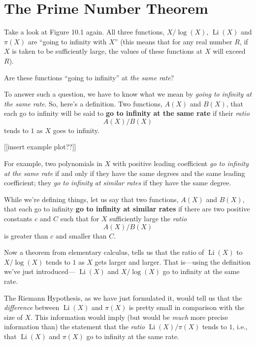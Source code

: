 \documentclass[11pt]{article}
\DeclareMathOperator{\Li}{Li}
\theoremstyle{plain}
\theoremstyle{definition}
\numberwithin{equation}{section}
\numberwithin{figure}{section}
\numberwithin{table}{section}
\begin{document}
\bigskip
 


\section{The Prime Number Theorem}
  
Take a look at Figure 10.1 again.  All three functions, $X/\log(X)$,
$\Li(X)$ and $\pi(X)$ are ``going to infinity with $X$'' (this means
that for any real number $R$, if $X$ is taken to be sufficiently
large, the values of these functions at $X$ will exceed $R$).

Are these functions ``going to infinity'' at {\it the same rate}?

To answer such a question, we have to know what we mean by {\it going
  to infinity at the same rate}. So, here's a definition. Two
functions, $A(X)$ and $B(X)$, that each go to infinity will be said to
{\bf go to infinity at the same rate} if their {\it ratio}
$$A(X)/B(X)$$ 
tends to $1$ as $X$ goes to infinity.


[[insert example plot??]]

For example, two polynomials in $X$ with positive leading coefficient
{\it go to infinity at the same rate} if and only if they have the
same degrees and the same leading coefficient; they {\it go to
  infinity at similar rates} if they have the same degree.
    
While we're defining things, let us say that two functions, $A(X)$
and $B(X)$, that each go to infinity {\bf go to infinity at
similar rates} if there are two positive constants $c$ and $C$
such that for $X$ sufficiently large the {\it ratio}
$$
      A(X)/B(X)
$$
is greater than $c$ and smaller than $C$.
    
Now a theorem from elementary calculus, tells us that the ratio of
$\Li(X)$ to $X/\log(X)$ tends to $1$ as $X$ gets larger and larger.
That is---using the definition we've just introduced--- $\Li(X)$ and
$X/\log(X)$ go to infinity at the same rate.
  
The Riemann Hypothesis, as we have just formulated it, would tell us
that the {\it difference} between $\Li(X)$ and $\pi(X)$ is pretty small
in comparison with the size of $X$. This information would imply (but
would be {\it much} more precise information than) the statement that
the {\it ratio} $\Li(X)/\pi(X)$ tends to $1$, i.e., that $\Li(X)$ and
$\pi(X)$ go to infinity at the same rate.
\end{document}
